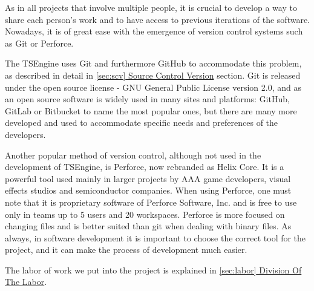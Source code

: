 As in all projects that involve multiple people, it is crucial to develop a way to share each person's work and to have access to previous iterations of the software. Nowadays, it is of great ease with the emergence of version control systems such as Git or Perforce. 

The TSEngine uses Git and furthermore GitHub to accommodate this problem, as described in detail in \hyperref[sec:scv]{\ref*{sec:scv} Source Control Version} section. Git is released under the open source license -  GNU General Public License version 2.0, and as an open source software is widely used in many sites and platforms: GitHub, GitLab or Bitbucket to name the most popular ones, but there are many more developed and used to accommodate specific needs and preferences of the developers.

Another popular method of version control, although not used in the development of TSEngine, is Perforce, now rebranded as Helix Core. It is a powerful tool used mainly in larger projects by AAA game developers, visual effects studios and semiconductor companies. When using Perforce, one must note that it is proprietary software of Perforce Software, Inc. and is free to use only in teams up to 5 users and 20 workspaces. Perforce is more focused on changing files and is better suited than git when dealing with binary files. As always, in software development it is important to choose the correct tool for the project, and it can make the process of development much easier.

The labor of work we put into the project is explained in \hyperref[]{\ref*{sec:labor} Division Of The Labor}.



